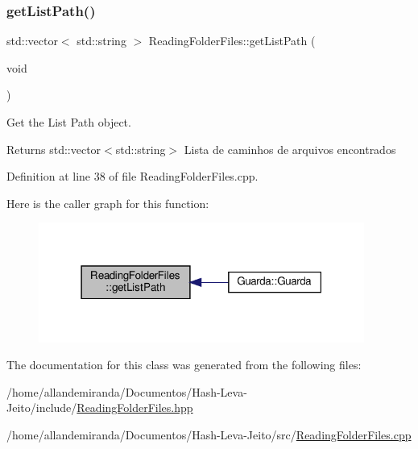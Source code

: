 \subsubsection{\texorpdfstring{get\+List\+Path()}{getListPath()}}
{\footnotesize\ttfamily std\+::vector$<$ std\+::string $>$ Reading\+Folder\+Files\+::get\+List\+Path (\begin{DoxyParamCaption}\item[{void}]{ }\end{DoxyParamCaption})}



Get the List Path object. 

\begin{DoxyReturn}{Returns}
std\+::vector$<$std\+::string$>$ Lista de caminhos de arquivos encontrados 
\end{DoxyReturn}


Definition at line 38 of file Reading\+Folder\+Files.\+cpp.

Here is the caller graph for this function\+:
\nopagebreak
\begin{figure}[H]
\begin{center}
\leavevmode
\includegraphics[width=303pt]{da/da7/class_reading_folder_files_ae4eb52dbef433f34d5ccee66ebc02855_icgraph}
\end{center}
\end{figure}


The documentation for this class was generated from the following files\+:\begin{DoxyCompactItemize}
\item 
/home/allandemiranda/\+Documentos/\+Hash-\/\+Leva-\/\+Jeito/include/\hyperlink{_reading_folder_files_8hpp}{Reading\+Folder\+Files.\+hpp}\item 
/home/allandemiranda/\+Documentos/\+Hash-\/\+Leva-\/\+Jeito/src/\hyperlink{_reading_folder_files_8cpp}{Reading\+Folder\+Files.\+cpp}\end{DoxyCompactItemize}
